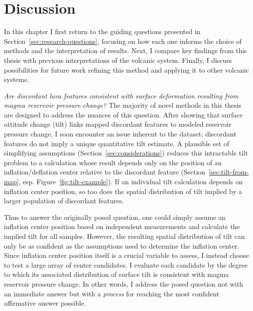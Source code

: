 \chapter{Discussion}\label{cha:discussion}

In this chapter I first return to the guiding questions presented in Section~\ref{sec:research-questions}, focusing on how each one informs the choice of methods and the interpretation of results. Next, I compare key findings from this thesis with previous interpretations of the volcanic system. Finally, I discuss possibilities for future work refining this method and applying it to other volcanic systems. 

\emph{Are discordant lava features consistent with surface deformation resulting from magma reservoir pressure change?} The majority of novel methods in this thesis are designed to address the nuances of this question. After showing that surface attitude change (tilt) links mapped discordant features to modeled reservoir pressure change, I soon encounter an issue inherent to the dataset: discordant features do not imply a unique quantitative tilt estimate. A plausible set of simplifying assumptions (Section~\ref{sec:considerations}) reduces this intractable tilt problem to a calculation whose result depends only on the position of an inflation/deflation center relative to the discordant feature (Section~\ref{sec:tilt-from-map}, esp. Figure~\ref{fig:tilt-example}). If an individual tilt calculation depends on inflation center position, so too does the spatial distribution of tilt implied by a larger population of discordant features.

Thus to answer the originally posed question, one could simply assume an inflation center position based on independent measurements and calculate the implied tilt for all samples. However, the resulting spatial distribution of tilt can only be as confident as the assumptions used to determine the inflation center. Since inflation center position itself is a crucial variable to assess, I instead choose to test a large array of center candidates. I evaluate each candidate by the degree to which its associated distribution of surface tilt is consistent with magma reservoir pressure change. In other words, I address the posed question not with an immediate answer but with a \emph{process} for reaching the most confident affirmative answer possible.

